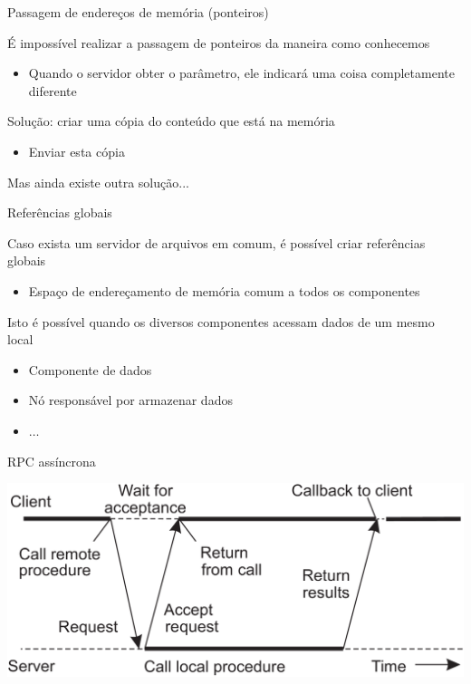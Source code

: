 \documentclass[compress]{beamer}
\begin{document}

\begin{frame}{Passagem de endereços de memória (ponteiros)}

É impossível realizar a passagem de ponteiros da maneira como conhecemos
\begin{itemize}
    \item Quando o servidor obter o parâmetro, ele indicará uma coisa completamente diferente
\end{itemize}

\vspace{0.5cm}

Solução: criar uma cópia do conteúdo que está na memória
\begin{itemize}
    \item Enviar esta cópia
\end{itemize}

Mas ainda existe outra solução...
\end{frame}


\begin{frame}{Referências globais}

Caso exista um servidor de arquivos em comum, é possível criar referências globais
\begin{itemize}
    \item Espaço de endereçamento de memória comum a todos os componentes
\end{itemize}

Isto é possível quando os diversos componentes acessam dados de um mesmo local
\begin{itemize}
    \item Componente de dados
    \item Nó responsável por armazenar dados
    \item $\ldots$
\end{itemize}
\end{frame}


\begin{frame}{RPC assíncrona}

\vspace{0.5cm}

\centering \includegraphics[width=\textwidth]{images/rpc_assincrona.png}

\end{frame}
\end{document}
